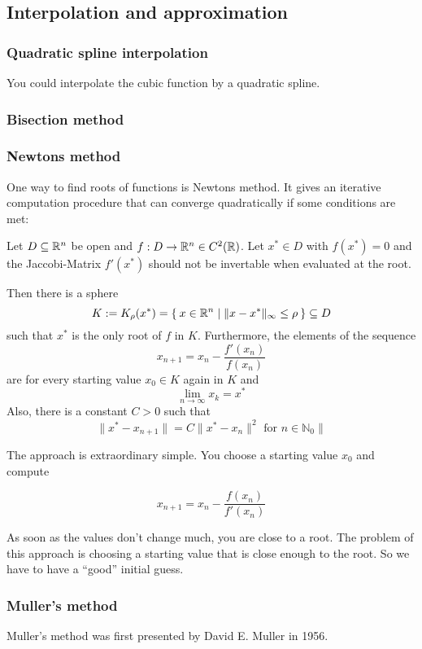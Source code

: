 \subsection{Interpolation and approximation}
\subsubsection{Quadratic spline interpolation}
You could interpolate the cubic function by a quadratic spline.

\subsubsection{Bisection method}

\subsubsection{Newtons method}
One way to find roots of functions is Newtons method. It gives an
iterative computation procedure that can converge quadratically 
if some conditions are met:

\begin{theorem}
    Let $D \subseteq \mathbb{R}^n$ be open and $f: D \rightarrow \mathbb{R}^n \in C^2(\mathbb{R})$.
    Let $x^* \in D$ with $f(x^*) = 0$ and the Jaccobi-Matrix $f'(x^*)$
    should not be invertable when evaluated at the root.

    Then there is a sphere 
    \[K := K_\rho(x^*) = \Set{x \in \ensuremath{\mathbb{R}}^n | \|x- x^*\|_\infty \leq \rho} \subseteq D\]
    such that $x^*$ is the only root of $f$ in $K$. Furthermore,
    the elements of the sequence
    \[ x_{n+1} = x_n - \frac{f'(x_n)}{f(x_n)}\]
    are for every starting value $x_0 \in K$ again in $K$ and
    \[\lim_{n \rightarrow \infty} x_k = x^*\]
    Also, there is a constant $C > 0$ such that
    \[\|x^* - x_{n+1} \| = C \|x^* - x_n\|^2 \text{ for } n \in \mathbb{N}_0\|\]
\end{theorem}

The approach is extraordinary simple. You choose a starting value
$x_0$ and compute

\[x_{n+1} = x_n - \frac{f(x_n)}{f'(x_n)}\]

As soon as the values don't change much, you are close to a root.
The problem of this approach is choosing a starting value that is
close enough to the root. So we have to have a \enquote{good}
initial guess.
\clearpage

\subsubsection{Muller's method}
Muller's method was first presented by David E. Muller in 1956.

